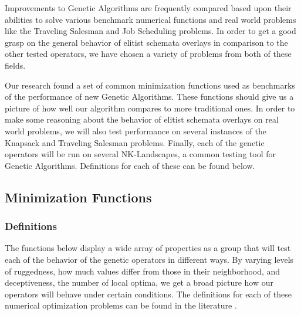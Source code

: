 Improvements to Genetic Algorithms are frequently compared based upon their abilities to solve various benchmark numerical functions and real world problems like the Traveling Salesman and Job Scheduling problems\cite{molga05}. In order to get a good grasp on the general behavior of elitist schemata overlays in comparison to the other tested operators, we have chosen a variety of problems from both of these fields. 

Our research found a set of common minimization functions used as benchmarks of the performance of new Genetic Algorithms\cite{Deb99,Eiben95,Tsutsui99}. These functions should give us a picture of how well our algorithm compares to more traditional ones. In order to make some reasoning about the behavior of elitist schemata overlays on real world problems, we will also test performance on several instances of the Knapsack and Traveling Salesman problems. Finally, each of the genetic operators will be run on several NK-Landscapes, a common testing tool for Genetic Algorithms. Definitions for each of these can be found below.

\subsection*{Minimization Functions}
\subsubsection*{Definitions}

The functions below display a wide array of properties as a group that will test each of the behavior of the genetic operators in different ways. By varying levels of ruggedness, how much values differ from those in their neighborhood, and deceptiveness, the number of local optima, we get a broad picture how our operators will behave under certain conditions. The definitions for each of these numerical optimization problems can be found in the literature \cite{molga05,yang10}.

